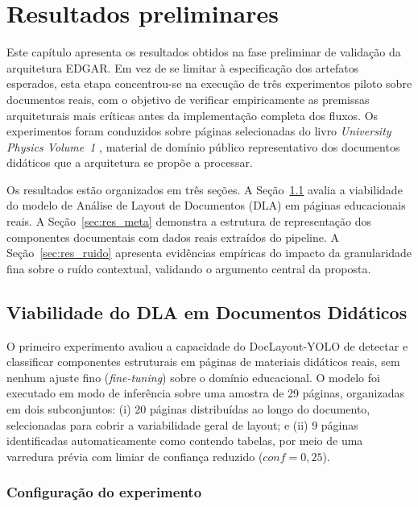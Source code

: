 \chapter{Resultados preliminares}
\label{chap:resultados-preliminares}

Este capítulo apresenta os resultados obtidos na fase preliminar de
validação da arquitetura EDGAR. Em vez de se limitar à especificação
dos artefatos esperados, esta etapa concentrou-se na execução de três
experimentos piloto sobre documentos reais, com o objetivo de verificar
empiricamente as premissas arquiteturais mais críticas antes da
implementação completa dos fluxos. Os experimentos foram conduzidos
sobre páginas selecionadas do livro \textit{University Physics Volume~1}
\cite{ling2016university}, material de domínio público representativo dos
documentos didáticos que a arquitetura se propõe a processar.

Os resultados estão organizados em três seções. A Seção~\ref{sec:res_dla}
avalia a viabilidade do modelo de Análise de Layout de Documentos (DLA)
em páginas educacionais reais. A Seção~\ref{sec:res_meta} demonstra a
estrutura de representação dos componentes documentais com dados reais
extraídos do pipeline. A Seção~\ref{sec:res_ruido} apresenta evidências
empíricas do impacto da granularidade fina sobre o ruído contextual,
validando o argumento central da proposta.

\section{Viabilidade do DLA em Documentos Didáticos}
\label{sec:res_dla}

O primeiro experimento avaliou a capacidade do DocLayout-YOLO de
detectar e classificar componentes estruturais em páginas de materiais
didáticos reais, sem nenhum ajuste fino (\textit{fine-tuning}) sobre o
domínio educacional. O modelo foi executado em modo de inferência sobre
uma amostra de 29 páginas, organizadas em dois subconjuntos: (i) 20
páginas distribuídas ao longo do documento, selecionadas para cobrir a
variabilidade geral de layout; e (ii) 9 páginas identificadas
automaticamente como contendo tabelas, por meio de uma varredura prévia
com limiar de confiança reduzido ($conf = 0{,}25$).

\subsection{Configuração do experimento}
\label{subsec:dla_config}

